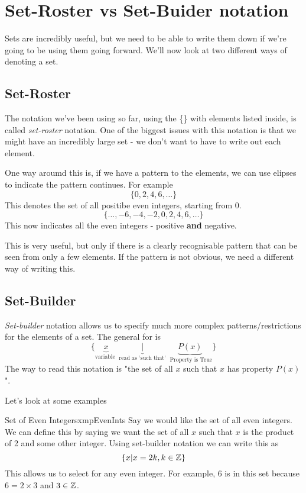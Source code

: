 \section{Set-Roster vs Set-Buider notation}

Sets are incredibly useful, but we need to be able to write them down if we're going to be using them going forward. We'll now look at two different ways of denoting a set.

\subsection*{Set-Roster}
The notation we've been using so far, using the \{\} with elements listed inside, is called \emph{set-roster} notation. One of the biggest issues with this notation is that we might have an incredibly large set - we don't want to have to write out each element.

One way aroumd this is, if we have a pattern to the elements, we can use elipses to indicate the pattern continues. For example
$$\{0,2,4,6,\dots\}$$
This denotes the set of all positibe even integers, starting from 0.
$$\{\dots,-6,-4,-2,0,2,4,6,\dots\}$$
This now indicates all the even integers - positive \textbf{and} negative.

This is very useful, but only if there is a clearly recognisable pattern that can be seen from only a few elements. If the pattern is not obvious, we need a different way of writing this.

\subsection*{Set-Builder}
\emph{Set-builder} notation allows us to specify much more complex patterns/restrictions for the elements of a set. The general for is
$$\{\underbrace{x}_{\text{variable }} \underbrace{|}_{\text{ read as 'such that' }} \underbrace{P(x)}_{\text{ Property is True}}\}$$
The way to read this notation is "the set of all $x$ such that $x$ has property $P(x)$".

Let's look at some examples
\begin{exmpl}[label={exmpl:evenints}]{Set of Even Integers}{xmpEvenInts}
    Say we would like the set of all even integers. We can define this by saying we want the set of all $x$ such that $x$ is the product of 2 and some other integer. Using set-builder notation we can write this as
    $$\{x | x = 2k, k \in \mathbb{Z}\}$$
    This allows us to select for any even integer. For example, 6 is in this set because $6 = 2 \times 3$ and $3 \in \mathbb{Z}$.
\end{exmpl}

